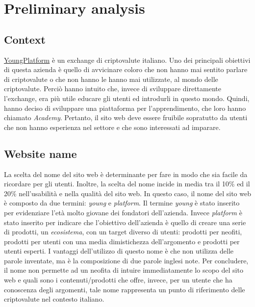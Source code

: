 \section{Preliminary analysis}

\subsection{Context}

\href{https://youngplatform.com}{YoungPlatform} è un exchange di 
criptovalute italiano. Uno dei principali obiettivi di questa azienda è 
quello di avvicinare coloro che non hanno mai sentito parlare di 
criptovalute o che non hanno le hanno mai utilizzate, al mondo delle 
criptovalute. Perciò hanno intuito che, invece di sviluppare direttamente 
l'exchange, era più utile educare gli utenti ed introdurli in questo 
mondo. Quindi, hanno deciso di sviluppare una piattaforma per 
l'apprendimento, che loro hanno chiamato \textit{Academy}. Pertanto, il 
sito web deve essere fruibile sopratutto da utenti che non hanno esperienza 
nel settore e che sono interessati ad imparare. 

\subsection{Website name}

La scelta del nome del sito web è determinante per fare in modo che sia 
facile da ricordare per gli utenti. Inoltre, la scelta del nome incide 
in media tra il 10\% ed il 20\% nell'usabilità e nella qualità del sito web. 
In questo caso, il nome del sito web è composto da due termini: 
\textit{young} e \textit{platform}. Il termine \textit{young} è stato 
inserito per evidenziare l'età molto giovane dei fondatori dell'azienda. 
Invece \textit{platform} è stato inserito per indicare che l'obiettivo 
dell'azienda è quello di creare una serie di prodotti, un 
\textit{ecosistema}, con un target diverso di utenti: prodotti per neofiti, 
prodotti per utenti con una media dimistichezza dell'argomento e prodotti 
per utenti esperti. I vantaggi dell'utilizzo di questo nome è che non 
utilizza delle parole inventate, ma è la composizione di due parole 
inglesi note. Per concludere, il nome non permette ad un neofita di 
intuire immediatamente lo scopo del sito web e quali sono i 
contenuti/prodotti che offre, invece, per un utente che ha conoscenza 
degli argomenti, tale nome rappresenta un punto di riferimento delle 
criptovalute nel contesto italiano.

